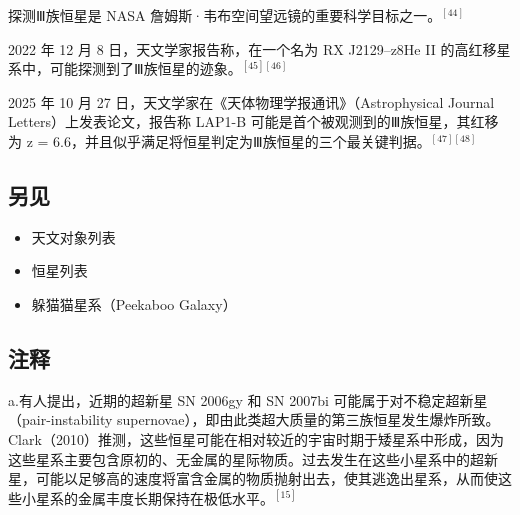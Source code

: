 探测Ⅲ族恒星是 NASA 詹姆斯·韦布空间望远镜的重要科学目标之一。$^{[44]}$

2022 年 12 月 8 日，天文学家报告称，在一个名为 RX J2129–z8He II 的高红移星系中，可能探测到了Ⅲ族恒星的迹象。$^{[45][46]}$

2025 年 10 月 27 日，天文学家在《天体物理学报通讯》（Astrophysical Journal Letters）上发表论文，报告称 LAP1-B 可能是首个被观测到的Ⅲ族恒星，其红移为 z = 6.6，并且似乎满足将恒星判定为Ⅲ族恒星的三个最关键判据。$^{[47][48]}$
\subsection{另见}
\begin{itemize}
\item 天文对象列表
\item 恒星列表
\item 躲猫猫星系（Peekaboo Galaxy）
\end{itemize}

\subsection{注释}
a.有人提出，近期的超新星 SN 2006gy 和 SN 2007bi 可能属于对不稳定超新星（pair-instability supernovae），即由此类超大质量的第三族恒星发生爆炸所致。Clark（2010）推测，这些恒星可能在相对较近的宇宙时期于矮星系中形成，因为这些星系主要包含原初的、无金属的星际物质。过去发生在这些小星系中的超新星，可能以足够高的速度将富含金属的物质抛射出去，使其逃逸出星系，从而使这些小星系的金属丰度长期保持在极低水平。$^{[15]}$
